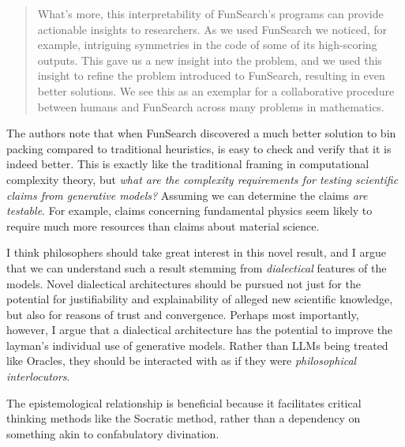 \documentclass[11pt, oneside]{article}   	%
\begin{document}

\begin{quote}
    What’s more, this interpretability of FunSearch’s programs can provide actionable insights to researchers. As we used FunSearch we noticed, for example, intriguing symmetries in the code of some of its high-scoring outputs. This gave us a new insight into the problem, and we used this insight to refine the problem introduced to FunSearch, resulting in even better solutions. We see this as an exemplar for a collaborative procedure between humans and FunSearch across many problems in mathematics.

    \citep{FunSearch2024}
\end{quote}


The authors note that when FunSearch discovered a much better solution to bin packing compared to traditional heuristics, is easy to check and verify that it is indeed better.  This is exactly like the traditional framing in computational complexity theory, but \emph{what are the complexity requirements for testing scientific claims from generative models?}  Assuming we can determine the claims \emph{are testable}.  For example, claims concerning fundamental physics seem likely to require much more resources than claims about material science.

I think philosophers should take great interest in this novel result, and I argue that we can understand such a result stemming from \emph{dialectical} features of the models.  Novel dialectical architectures should be pursued not just for the potential for justifiability and explainability of alleged new scientific knowledge, but also for reasons of trust and convergence.  Perhaps most importantly, however, I argue that a dialectical architecture has the potential to improve the layman's individual use of generative models.  Rather than LLMs being treated like Oracles, they should be interacted with as if they were \emph{philosophical interlocutors}.  

The epistemological relationship is beneficial because it facilitates critical thinking methods like the Socratic method, rather than a dependency on something akin to confabulatory divination.  
\end{document}
